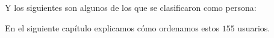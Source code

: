 Y los siguientes son algunos de los que se clasificaron como persona:



En el siguiente capítulo explicamos cómo ordenamos estos $155$ usuarios.

